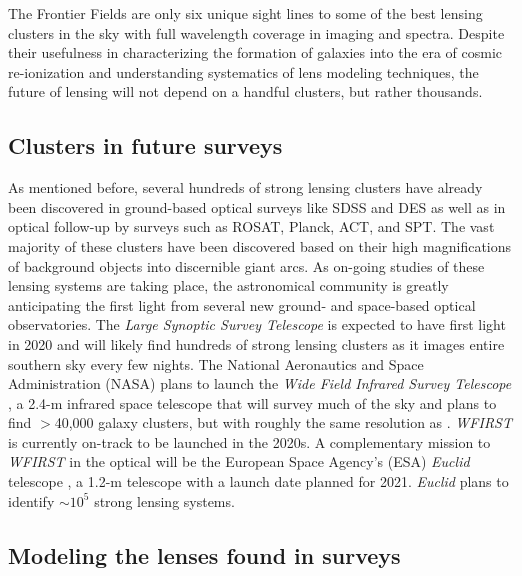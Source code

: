 The Frontier Fields are only six unique sight lines to some of the best lensing clusters in the sky with full wavelength coverage in imaging and spectra. Despite their usefulness in characterizing the formation of galaxies into the era of cosmic re-ionization and understanding systematics of lens modeling techniques, the future of lensing will not depend on a handful clusters, but rather thousands.

\subsection{Clusters in future surveys}

As mentioned before, several hundreds of strong lensing clusters have already been discovered in ground-based optical surveys like SDSS and DES as well as in optical follow-up by surveys such as ROSAT, Planck, ACT, and SPT. The vast majority of these clusters have been discovered based on their high magnifications of background objects into discernible giant arcs. As on-going studies of these lensing systems are taking place, the astronomical community is greatly anticipating the first light from several new ground- and space-based optical observatories. The {\it Large Synoptic Survey Telescope} \citep[{\it LSST}; ][]{IVezic:2008tv} is expected to have first light in 2020 and will likely find hundreds of strong lensing clusters as it images entire southern sky every few nights. The National Aeronautics and Space Administration (NASA) plans to launch the {\it Wide Field Infrared Survey Telescope} \citep[{\it WFIRST}; ][]{Spergel:2013zk}, a 2.4-m infrared space telescope that will survey much of the sky and plans to find $>$40,000 galaxy clusters, but with roughly the same resolution as \hst. {\it WFIRST} is currently on-track to be launched in the 2020s. A complementary mission to {\it WFIRST} in the optical will be the European Space Agency's (ESA) {\it Euclid} telescope \citep{Laureijs:2011qt}, a 1.2-m telescope with a launch date planned for 2021. {\it Euclid} plans to identify $\sim10^5$ strong lensing systems.

\subsection{Modeling the lenses found in surveys}

